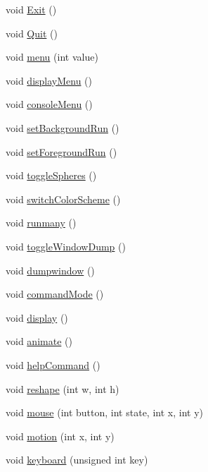 \begin{CompactItemize}
\item 
void \hyperlink{namespaceGui_992c5b9e252d42f351c0b4559f3dc594}{Exit} ()
\item 
void \hyperlink{namespaceGui_6fda3017d1da246375076a92d719888e}{Quit} ()
\item 
void \hyperlink{namespaceGui_b76fb09eeb57cd517ef9161f1d69b9a5}{menu} (int value)
\item 
void \hyperlink{namespaceGui_5780bf157b4553f0002f9c0bac80c57c}{displayMenu} ()
\item 
void \hyperlink{namespaceGui_8b9da92ca9a1573368c0a085b1121d54}{consoleMenu} ()
\item 
void \hyperlink{namespaceGui_8ade665fa0c7e87786e08242f88eff40}{setBackgroundRun} ()
\item 
void \hyperlink{namespaceGui_273a116825827361f5a21f8226589d35}{setForegroundRun} ()
\item 
void \hyperlink{namespaceGui_565addf34ff426cb969e2c56ed140d39}{toggleSpheres} ()
\item 
void \hyperlink{namespaceGui_ab3a8248d4ef4514f77fd2a50d70728a}{switchColorScheme} ()
\item 
void \hyperlink{namespaceGui_7799b76168d5342d97a7db05630b4c3a}{runmany} ()
\item 
void \hyperlink{namespaceGui_f65e92132f04c4a318e60fd3b4e7fa38}{toggleWindowDump} ()
\item 
void \hyperlink{namespaceGui_6ad1b72a8dc01fe97af9fe591a365a5e}{dumpwindow} ()
\item 
void \hyperlink{namespaceGui_90f0cf49fd3ea753450fa24a2a9675af}{commandMode} ()
\item 
void \hyperlink{namespaceGui_cb047c1330f58d16c1f9336aef134bbf}{display} ()
\item 
void \hyperlink{namespaceGui_bc885686e998a79d9c98f86c678d6e69}{animate} ()
\item 
void \hyperlink{namespaceGui_88a5c559d5b4309bd2c3d1ff11f93692}{helpCommand} ()
\item 
void \hyperlink{namespaceGui_fe299b50153348bf53b6910e74098c42}{reshape} (int w, int h)
\item 
void \hyperlink{namespaceGui_3971df0804b9da39b2c9a1b40f708b50}{mouse} (int button, int state, int x, int y)
\item 
void \hyperlink{namespaceGui_c6941f396ae4c5f4a14ed6f39820bd93}{motion} (int x, int y)
\item 
void \hyperlink{namespaceGui_8c6bd3add9cc9a25f67c4bcb75fb3c11}{keyboard} (unsigned int key)
\item 

\end{CompactItemize}
